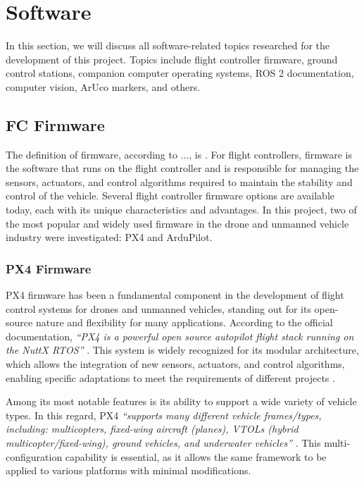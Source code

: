 
\section{Software}
In this section, we will discuss all software-related topics researched for the development of this project. Topics include flight controller firmware, ground control stations, companion computer operating systems, ROS 2 documentation, computer vision, ArUco markers, and others.

\subsection{FC Firmware}
The definition of firmware, according to ..., is \textit{} \cite{}. For flight controllers, firmware is the software that runs on the flight controller and is responsible for managing the sensors, actuators, and control algorithms required to maintain the stability and control of the vehicle. Several flight controller firmware options are available today, each with its unique characteristics and advantages. In this project, two of the most popular and widely used firmware in the drone and unmanned vehicle industry were investigated: PX4 and ArduPilot.

\subsubsection{PX4 Firmware}
PX4 firmware has been a fundamental component in the development of flight control systems for drones and unmanned vehicles, standing out for its open-source nature and flexibility for many applications. According to the official documentation, \textit{``PX4 is a powerful open source autopilot flight stack running on the NuttX RTOS''} \cite{px4_docs}. This system is widely recognized for its modular architecture, which allows the integration of new sensors, actuators, and control algorithms, enabling specific adaptations to meet the requirements of different projects \cite{px4_docs}.

Among its most notable features is its ability to support a wide variety of vehicle types. In this regard, PX4 \textit{``supports many different vehicle frames/types, including: multicopters, fixed-wing aircraft (planes), VTOLs (hybrid multicopter/fixed-wing), ground vehicles, and underwater vehicles''} \cite{px4_docs}. This multi-configuration capability is essential, as it allows the same framework to be applied to various platforms with minimal modifications.

